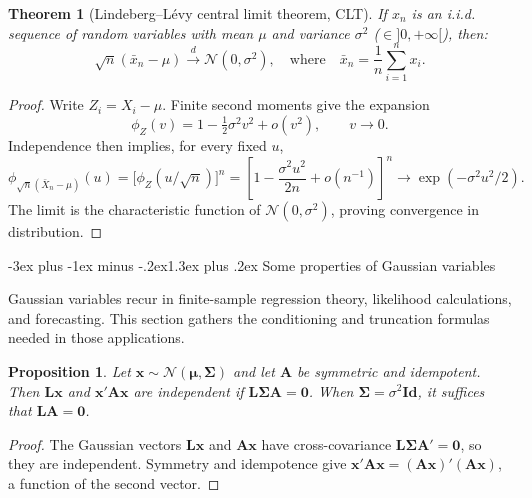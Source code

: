 \documentclass[
  11pt,
]{book}
\makeatletter
\renewcommand\section{\@startsection{section}{1}{\z@}
  {-3ex plus -1ex minus -.2ex}{1.3ex plus .2ex}
  {\normalfont\Large\bfseries\color{TextbookInk}}}
\newtheorem{theorem}{Theorem}[chapter]
\newtheorem{proposition}{Proposition}[chapter]
\theoremstyle{definition}
\theoremstyle{definition}
\theoremstyle{definition}
\theoremstyle{definition}
\theoremstyle{remark}
\makeatother
\begin{document}
\begin{theorem}[Lindeberg–Lévy central limit theorem, CLT]
\protect\hypertarget{thm:LindbergLevyCLTAppendix}{}\label{thm:LindbergLevyCLTAppendix}If \(x_n\) is an i.i.d. sequence of random variables with mean \(\mu\) and variance \(\sigma^2\) (\(\in ]0,+\infty[\)), then:
\[
\boxed{\sqrt{n} (\bar{x}_n - \mu) \overset{d}{\rightarrow} \mathcal{N}(0,\sigma^2), \quad \mbox{where} \quad \bar{x}_n = \frac{1}{n} \sum_{i=1}^{n} x_i.}
\]
\end{theorem}

\begin{proof}
Write \(Z_i=X_i-\mu\). Finite second moments give the expansion
\[
\phi_Z(v)=1-\tfrac12\sigma^2v^2+o(v^2),\qquad v\to0.
\]
Independence then implies, for every fixed \(u\),
\[
\phi_{\sqrt n(\bar X_n-\mu)}(u)
=\big[\phi_Z(u/\sqrt n)\big]^n
=\left[1-\frac{\sigma^2u^2}{2n}+o(n^{-1})\right]^n
\longrightarrow \exp(-\sigma^2u^2/2).
\]
The limit is the characteristic function of \(\mathcal N(0,\sigma^2)\), proving convergence in distribution.
\end{proof}

\section{Some properties of Gaussian variables}\label{GaussianVar}

Gaussian variables recur in finite-sample regression theory, likelihood calculations, and forecasting. This section gathers the conditioning and truncation formulas needed in those applications.

\begin{proposition}
\protect\hypertarget{prp:bandsindependent}{}\label{prp:bandsindependent}Let \(\mathbf{x}\sim\mathcal N(\boldsymbol\mu,\boldsymbol\Sigma)\) and let \(\mathbf{A}\) be symmetric and idempotent. Then \(\mathbf{L}\mathbf{x}\) and \(\mathbf{x}'\mathbf{A}\mathbf{x}\) are independent if \(\mathbf{L}\boldsymbol\Sigma\mathbf{A}=\mathbf{0}\). When \(\boldsymbol\Sigma=\sigma^2\mathbf{Id}\), it suffices that \(\mathbf{L}\mathbf{A}=\mathbf{0}\).
\end{proposition}

\begin{proof}
The Gaussian vectors \(\mathbf{L}\mathbf{x}\) and \(\mathbf{A}\mathbf{x}\) have cross-covariance \(\mathbf{L}\boldsymbol\Sigma\mathbf{A}'=\mathbf{0}\), so they are independent. Symmetry and idempotence give \(\mathbf{x}'\mathbf{A}\mathbf{x}=(\mathbf{A}\mathbf{x})'(\mathbf{A}\mathbf{x})\), a function of the second vector.
\end{proof}
\end{document}
